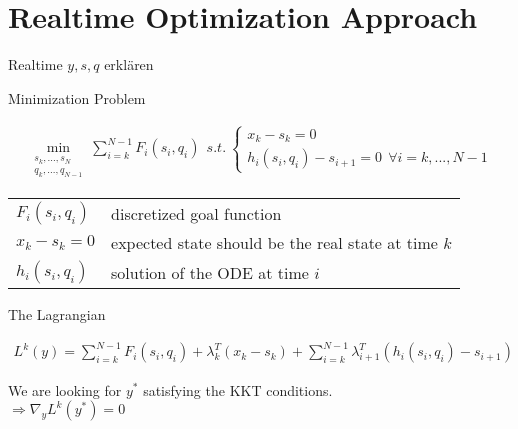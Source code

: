 \section{Realtime Optimization Approach}
\begin{frame}{Realtime}
$y, s, q$ erklären
\end{frame}

\begin{frame}{Minimization Problem}
\begin{block}{ }
\small{
\begin{align*}
  \min_{\begin{array}{c} s_{k},...,s_{N}\\ q_{k},...,q_{N-1} \end{array}} \sum_{i=k}^{N-1} F_{i}(s_{i},q_{i}) \ \  
  s.t. \ \left\lbrace \begin{array}{c}
  x_{k} - s_{k} = 0 \\
  h_i (s_i ,q_i ) - s_{i+1} = 0 \ \ \forall i = k, ... , N-1 \end{array} \right. 
\end{align*}}
\end{block}
\vspace{1em}
\begin{tabular}{l l}
  $F_i(s_i, q_i)$ &  discretized goal function \\
$x_k - s_k = 0$ & expected state should be the real state at time $k$ \\
$h_i (s_i ,q_i )$ & solution of the ODE at time $i$ \\
\end{tabular}
\end{frame}

\begin{frame}{The Lagrangian}
\begin{block}{ }
\begin{align*}
  L^{k}(y) = \sum_{i=k}^{N-1} F_{i}(s_{i},q_{i})
  + \lambda_{k}^{T}(x_{k} - s_{k})
  + \sum_{i=k}^{N-1} \lambda_{i+1}^{T} (h_i (s_i ,q_i ) - s_{i+1})
\end{align*}
\end{block}
\begin{center}
We are looking for $y^*$ satisfying the KKT conditions. \\

$\Rightarrow \nabla_{y} L^{k}(y^*)  = 0 $ 

\end{center}
\end{frame}

